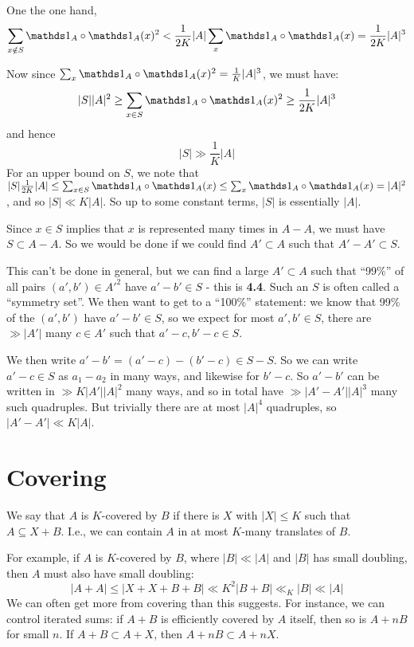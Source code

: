 \documentclass[10pt,a4paper]{article}
\begin{document}
One the one hand,
\[\sum_{x\notin S}\one_A\circ\one_A(x)^2 < \frac{1}{2K}|A|\sum_{x}\one_A\circ\one_A(x) = \frac{1}{2K}|A|^3\]

Now since $\sum_{x} \one_A\circ\one_A(x)^2 = \frac{1}{K}|A|^3$, we must have:
\[|S||A|^2 \geq \sum_{x\in S}\one_A\circ\one_A(x)^2 \geq \frac{1}{2K}|A|^3\]
and hence
\[|S| \gg \frac{1}{K}|A|\]
For an upper bound on $S$, we note that $|S|\frac{1}{2K}|A| \leq \sum_{x \in S}\one_A \circ\one_A(x) \leq \sum_x \one_A\circ\one_A(x) = |A|^2$, and so $|S| \ll K|A|$. So up to some constant terms, $|S|$ is essentially $|A|$.

Since $x \in S$ implies that $x$ is represented many times in $A-A$, we must have $S \subset A-A$. So we would be done if we could find $A'\subset A$ such that $A'-A' \subset S$.

This can't be done in general, but we can find a large $A'\subset A$ such that ``99\%'' of all pairs $(a',b') \in A'^2$ have $a'-b'\in S$ - this is \textbf{4.4}. Such an $S$ is often called a ``symmetry set''. We then want to get to a ``100\%'' statement: we know that 99\% of the $(a',b')$ have $a'-b'\in S$, so we expect for most $a',b' \in S$, there are $\gg |A'|$ many $c\in A'$ such that $a'-c, b'-c \in S$.

We then write $a'-b' = (a'-c)-(b'-c) \in S-S$. So we can write $a'-c \in S$ as $a_1-a_2$ in many ways, and likewise for $b'-c$. So $a'-b'$ can be written in $\gg K|A'||A|^2$ many ways, and so in total have $\gg |A'-A'||A|^3$ many such quadruples. But trivially there are at most $|A|^4$ quadruples, so $|A'-A'|\ll K|A|$.

\section{Covering}
We say that $A$ is $K$-covered by $B$ if there is $X$ with $|X| \leq K$ such that $A \subseteq X+B$. I.e., we can contain $A$ in at most $K$-many translates of $B$.

For example, if $A$ is $K$-covered by $B$, where $|B|\ll|A|$ and $|B|$ has small doubling, then $A$ must also have small doubling:
\[|A+A| \leq |X+X+B+B|\ll K^2|B+B|\ll_K |B| \ll |A|\]
We can often get more from covering than this suggests. For instance, we can control iterated sums: if $A+B$ is efficiently covered by $A$ itself, then so is $A+nB$ for small $n$. If $A+B \subset A+X$, then $A+nB \subset A+nX$.
\end{document}
